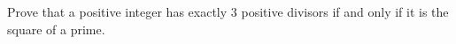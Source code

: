 Prove that a positive integer has exactly $3$ positive divisors if and only if it is the square of a prime.
